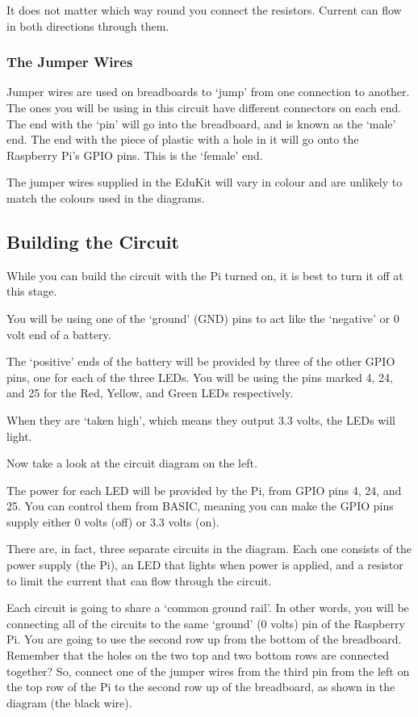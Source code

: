 It does not matter which way round you connect the resistors.  Current can flow in both directions through them.

\subsubsection*{The Jumper Wires}


Jumper wires are used on breadboards to `jump' from one connection to another.  The ones you will be using in this circuit have different connectors on each end.  The end with the `pin' will go into the breadboard, and is known as the `male' end.  The end with the piece of plastic with a hole in it will go onto the Raspberry Pi's GPIO pins.  This is the `female' end.

The jumper wires supplied in the EduKit will vary in colour and are unlikely to match the colours used in the diagrams.

\subsection*{Building the Circuit}

While you can build the circuit with the Pi turned on, it is best to turn it off at this stage.

You will be using one of the `ground' (GND) pins to act like the `negative' or 0 volt end of a battery.


The `positive' ends of the battery will be provided by three of the other GPIO pins, one for each of the three LEDs.  You will be using the pins marked 4, 24, and 25 for the Red, Yellow, and Green LEDs respectively.

When they are `taken high', which means they output 3.3 volts, the LEDs will light.

Now take a look at the circuit diagram on the left.

The power for each LED will be provided by the Pi, from GPIO pins 4, 24, and 25.  You can control them from BASIC, meaning you can make the GPIO pins supply either 0 volts (off) or 3.3 volts (on).

There are, in fact, three separate circuits in the diagram.  Each one consists of the power supply (the Pi), an LED that lights when power is applied, and a resistor to limit the current that can flow through the circuit.

Each circuit is going to share a `common ground rail'.  In other words, you will be connecting all of the circuits to the same `ground' (0 volts) pin of the Raspberry Pi.  You are going to use the second row up from the bottom of the breadboard.  Remember that the holes on the two top and two bottom rows are connected together?  So, connect one of the jumper wires from the third pin from the left on the top row of the Pi to the second row up of the breadboard, as shown in the diagram (the black wire).

